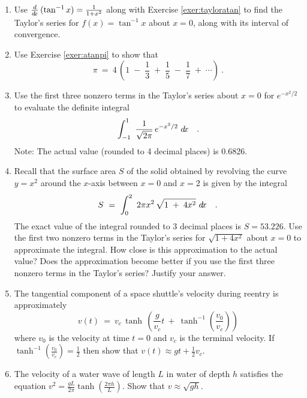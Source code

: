 {\begin{enumerate}[\bfseries 1.]
 \item\label{exer:atanpi} Use $\frac{d}{d\!x}\,(\tan^{-1} x) = \frac{1}{1+x^2}$ along with
  Exercise \ref{exer:tayloratan} to find the Taylor's series for
  $f(x)=\tan^{-1} x$ about $x=0$, along with its interval of convergence.
 \item Use Exercise \ref{exer:atanpi} to show that
\[
\pi ~=~ 4\,\left(1 \;-\; \frac{1}{3} \;+\; \frac{1}{5} \;-\; \frac{1}{7}
\;+\; \cdots \right) ~.
\]
 \item Use the first three nonzero terms in the Taylor's series about $x=0$ for
 $e^{-x^2/2}$ to evaluate the definite integral
 \begin{displaymath}
  \int_{-1}^1 ~\frac{1}{\sqrt{2\pi}} \,e^{-x^2/2}~d\!x \quad .
 \end{displaymath}
  Note: The actual value (rounded to 4 decimal places) is 0.6826.
 \item Recall that the surface area $S$ of the solid obtained by revolving the
  curve $y = x^2$ around the $x$-axis between $x = 0$ and $x = 2$ is given by
  the integral
 \begin{displaymath}
  S ~=~ \int_0^2 ~2 \pi x^2 \,\sqrt{1 \;+\; 4x^2}~d\!x \quad .
 \end{displaymath}
 The exact value of the integral rounded to 3 decimal places is $S = 53.226$.
 Use the first two nonzero terms in the Taylor's series for $\sqrt{1 + 4x^2}$
 about $x=0$ to approximate the integral. How close is this approximation to the
 actual value? Does the approximation become better if you use the first three
 nonzero terms in the Taylor's series? Justify your answer.
 \item The tangential component of a space shuttle's velocity during reentry is
 approximately
\[
 v(t) ~=~ v_c \,\tanh\,\left( \frac{g}{v_c} t ~+~
 \tanh^{-1} \left(\frac{v_0}{v_c}\right) \right)
\]
  where $v_0$ is the velocity at time $t=0$ and $v_c$ is the terminal velocity.
  If $\tanh^{-1} \left(\frac{v_0}{v_c}\right) = \frac{1}{2}$ then show that
  $v(t) \approx gt + \frac{1}{2}v_c$.
 \item The velocity of a water wave of length $L$ in water of depth $h$
 satisfies the equation
 $v^2 = \frac{gL}{2\pi} \tanh \left( \frac{2\pi h}{L}\right)$. Show that
 $v \approx \sqrt{gh}$.

\end{enumerate}}
